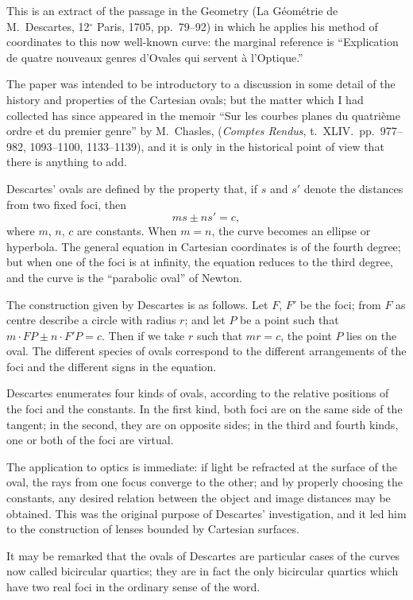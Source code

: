 \documentclass[11pt,a4paper]{article}
\theoremstyle{plain}
\begin{document}
This is an extract of the passage in the Geometry (La G\'eom\'etrie de M.~Descartes, 12$^{\circ}$ Paris, 1705, pp.~79--92) in which he applies his method of coordinates to this now well-known curve: the marginal reference is ``Explication de quatre nouveaux genres d'Ovales qui servent \`a l'Optique.''

The paper was intended to be introductory to a discussion in some detail of the history and properties of the Cartesian ovals; but the matter which I had collected has since appeared in the memoir ``Sur les courbes planes du quatri\`eme ordre et du premier genre'' by M.~Chasles, (\textit{Comptes Rendus}, t.~XLIV.~pp.~977--982, 1093--1100, 1133--1139), and it is only in the historical point of view that there is anything to add.

Descartes' ovals are defined by the property that, if $s$ and $s'$ denote the distances from two fixed foci, then
\[
ms \pm ns' = c,
\]
where $m$, $n$, $c$ are constants. When $m=n$, the curve becomes an ellipse or hyperbola. The general equation in Cartesian coordinates is of the fourth degree; but when one of the foci is at infinity, the equation reduces to the third degree, and the curve is the ``parabolic oval'' of Newton.

The construction given by Descartes is as follows. Let $F$, $F'$ be the foci; from $F$ as centre describe a circle with radius $r$; and let $P$ be a point such that $m\cdot FP \pm n\cdot F'P = c$. Then if we take $r$ such that $mr = c$, the point $P$ lies on the oval. The different species of ovals correspond to the different arrangements of the foci and the different signs in the equation.

Descartes enumerates four kinds of ovals, according to the relative positions of the foci and the constants. In the first kind, both foci are on the same side of the tangent; in the second, they are on opposite sides; in the third and fourth kinds, one or both of the foci are virtual.

The application to optics is immediate: if light be refracted at the surface of the oval, the rays from one focus converge to the other; and by properly choosing the constants, any desired relation between the object and image distances may be obtained. This was the original purpose of Descartes' investigation, and it led him to the construction of lenses bounded by Cartesian surfaces.

It may be remarked that the ovals of Descartes are particular cases of the curves now called bicircular quartics; they are in fact the only bicircular quartics which have two real foci in the ordinary sense of the word.
\end{document}
